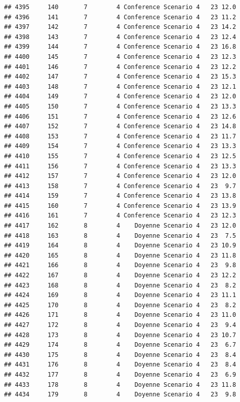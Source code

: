 \documentclass[
]{article}
\begin{document}
\begin{verbatim}
## 4395     140       7        4 Conference Scenario 4   23 12.0
## 4396     141       7        4 Conference Scenario 4   23 11.2
## 4397     142       7        4 Conference Scenario 4   23 14.2
## 4398     143       7        4 Conference Scenario 4   23 12.4
## 4399     144       7        4 Conference Scenario 4   23 16.8
## 4400     145       7        4 Conference Scenario 4   23 12.3
## 4401     146       7        4 Conference Scenario 4   23 12.2
## 4402     147       7        4 Conference Scenario 4   23 15.3
## 4403     148       7        4 Conference Scenario 4   23 12.1
## 4404     149       7        4 Conference Scenario 4   23 12.0
## 4405     150       7        4 Conference Scenario 4   23 13.3
## 4406     151       7        4 Conference Scenario 4   23 12.6
## 4407     152       7        4 Conference Scenario 4   23 14.8
## 4408     153       7        4 Conference Scenario 4   23 11.7
## 4409     154       7        4 Conference Scenario 4   23 13.3
## 4410     155       7        4 Conference Scenario 4   23 12.5
## 4411     156       7        4 Conference Scenario 4   23 13.3
## 4412     157       7        4 Conference Scenario 4   23 12.0
## 4413     158       7        4 Conference Scenario 4   23  9.7
## 4414     159       7        4 Conference Scenario 4   23 13.8
## 4415     160       7        4 Conference Scenario 4   23 13.9
## 4416     161       7        4 Conference Scenario 4   23 12.3
## 4417     162       8        4    Doyenne Scenario 4   23 12.0
## 4418     163       8        4    Doyenne Scenario 4   23  7.5
## 4419     164       8        4    Doyenne Scenario 4   23 10.9
## 4420     165       8        4    Doyenne Scenario 4   23 11.8
## 4421     166       8        4    Doyenne Scenario 4   23  9.8
## 4422     167       8        4    Doyenne Scenario 4   23 12.2
## 4423     168       8        4    Doyenne Scenario 4   23  8.2
## 4424     169       8        4    Doyenne Scenario 4   23 11.1
## 4425     170       8        4    Doyenne Scenario 4   23  8.2
## 4426     171       8        4    Doyenne Scenario 4   23 11.0
## 4427     172       8        4    Doyenne Scenario 4   23  9.4
## 4428     173       8        4    Doyenne Scenario 4   23 10.7
## 4429     174       8        4    Doyenne Scenario 4   23  6.7
## 4430     175       8        4    Doyenne Scenario 4   23  8.4
## 4431     176       8        4    Doyenne Scenario 4   23  8.4
## 4432     177       8        4    Doyenne Scenario 4   23  6.9
## 4433     178       8        4    Doyenne Scenario 4   23 11.8
## 4434     179       8        4    Doyenne Scenario 4   23  9.8

\end{verbatim}
\end{document}
